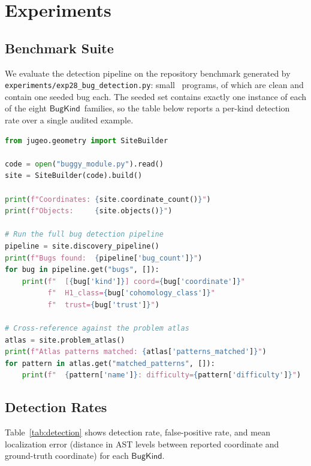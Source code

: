 \documentclass[11pt]{article}
\newcommand{\BugKind}{\ensuremath{\mathsf{BugKind}}}          %
\begin{document}
\section{Experiments}\label{sec:experiments}

\subsection{Benchmark Suite}

We evaluate the detection pipeline on the repository benchmark generated by
\texttt{experiments/exp28\_bug\_detection.py}: \ppTwentyeightTotalPrograms{}
small \Python\ programs, of which \ppTwentyeightCleanPrograms{} are clean and
\ppTwentyeightBuggyPrograms{} contain one seeded bug each.  The seeded set
contains exactly one instance of each of the eight \BugKind\ families, so the
table below reports a per-kind detection rate over a single audited example.

\begin{lstlisting}[language=Python, caption={Running \JuGeo{} bug detection via the Python API and inspecting the bug report.}]
from jugeo.geometry import SiteBuilder

code = open("buggy_module.py").read()
site = SiteBuilder(code).build()

print(f"Coordinates: {site.coordinate_count()}")
print(f"Objects:     {site.objects()}")

# Run the full bug detection pipeline
pipeline = site.discovery_pipeline()
print(f"Bugs found:  {pipeline['bug_count']}")
for bug in pipeline.get("bugs", []):
    print(f"  [{bug['kind']}] coord={bug['coordinate']}"
          f"  H1_class={bug['cohomology_class']}"
          f"  trust={bug['trust']}")

# Cross-reference against the problem atlas
atlas = site.problem_atlas()
print(f"Atlas patterns matched: {atlas['patterns_matched']}")
for pattern in atlas.get("matched_patterns", []):
    print(f"  {pattern['name']}: difficulty={pattern['difficulty']}")
\end{lstlisting}

\subsection{Detection Rates}

Table~\ref{tab:detection} shows detection rate, false-positive rate, and
mean localization error (distance in AST levels between reported coordinate
and ground-truth coordinate) for each \BugKind.
\end{document}
